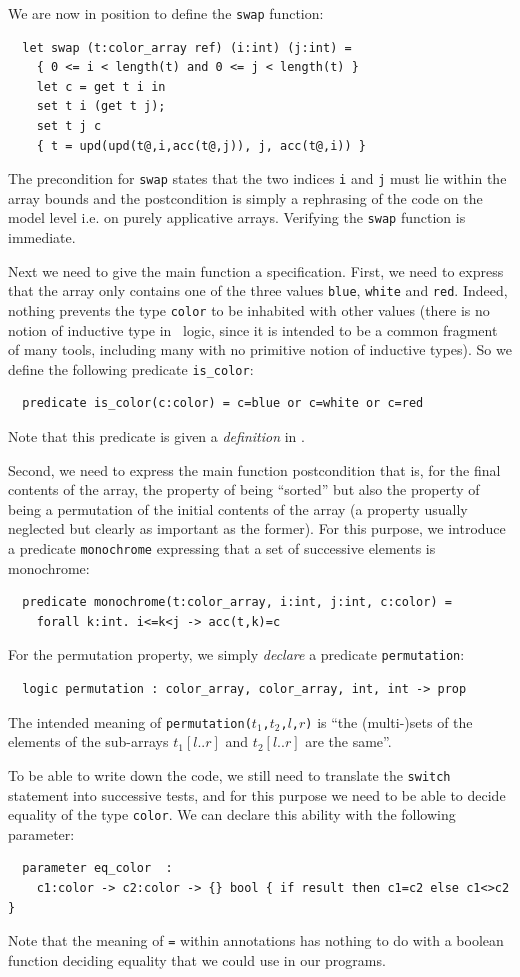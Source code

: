 \documentclass[a4paper,12pt]{report}
\begin{document}
We are now in position to define the \texttt{swap} function:
\begin{verbatim}
  let swap (t:color_array ref) (i:int) (j:int) =
    { 0 <= i < length(t) and 0 <= j < length(t) }
    let c = get t i in
    set t i (get t j);
    set t j c
    { t = upd(upd(t@,i,acc(t@,j)), j, acc(t@,i)) }
\end{verbatim}
The precondition for \texttt{swap} states that the two indices
\texttt{i} and \texttt{j} must lie within the array bounds and
the postcondition is simply a rephrasing of the code on the model
level i.e. on purely applicative arrays. Verifying the \texttt{swap}
function is immediate.

Next we need to give the main function a specification. First, we need
to express that the array only contains one of the three values
\texttt{blue}, \texttt{white} and \texttt{red}. Indeed, nothing
prevents the type \texttt{color} to be inhabited with other values
(there is no notion of inductive type in \why\ logic, since it is
intended to be a common fragment of many tools, including many with no
primitive notion of inductive types). So we define the following predicate
\texttt{is\_color}:
\begin{verbatim}
  predicate is_color(c:color) = c=blue or c=white or c=red
\end{verbatim}
Note that this predicate is given a \emph{definition} in \why. 

Second, we need to express the main function postcondition that is,
for the final contents of the array,
the property of being ``sorted'' but also the property of being a
permutation of the initial contents of the array (a property usually
neglected but clearly as important as the former). For this purpose,
we introduce a predicate \texttt{monochrome} expressing that a set of 
successive elements is monochrome:
\begin{verbatim}
  predicate monochrome(t:color_array, i:int, j:int, c:color) =
    forall k:int. i<=k<j -> acc(t,k)=c
\end{verbatim}
For the permutation property, we simply \emph{declare} a predicate
\texttt{permutation}:
\begin{verbatim}
  logic permutation : color_array, color_array, int, int -> prop
\end{verbatim}
The intended meaning of \texttt{permutation($t_1$,$t_2$,$l$,$r$)} is
``the (multi-)sets of the elements of the sub-arrays $t_1[l..r]$ and
$t_2[l..r]$ are the same''. 

To be able to write down the code, we still need to translate the
\texttt{switch} statement into successive tests, and for this purpose
we need to be able to decide equality of the type \texttt{color}.
We can declare this ability with the following parameter:
\begin{verbatim}
  parameter eq_color  : 
    c1:color -> c2:color -> {} bool { if result then c1=c2 else c1<>c2 }
\end{verbatim}
Note that the meaning of \texttt{=} within annotations has nothing to
do with a boolean function deciding equality that we could use in
our programs.
\end{document}
